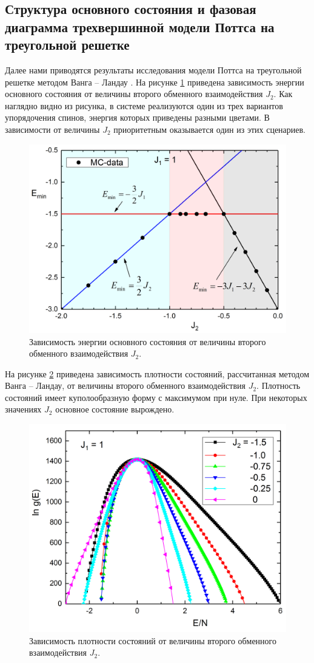 \subsection{Структура основного состояния и фазовая диаграмма трехвершинной модели Поттса на треугольной решетке}

Далее нами приводятся результаты исследования модели Поттса на треугольной решетке методом Ванга -- Ландау \cite{ph3_4, ph3_5, ph3_6, ph3_7}.
На рисунке \ref{phys3-pic-2} приведена зависимость энергии основного состояния от величины второго обменного взаимодействия $J_2$. Как наглядно видно из рисунка, в системе реализуются один из трех вариантов упорядочения спинов, энергия которых приведены разными цветами. В зависимости от величины $J_2$ приоритетным оказывается один из этих сценариев.

\begin{figure}[H]\label{phys3-pic-2}
	\centering
	\includegraphics[width=0.5\linewidth]{content/sections/images/phys3-2}
	\caption{Зависимость энергии основного состояния от величины второго обменного взаимодействия $J_2$.}
\end{figure}

На рисунке \ref{phys3-pic-3} приведена зависимость плотности состояний, рассчитанная методом Ванга -- Ландау, от величины второго обменного взаимодействия $J_2$. Плотность состояний имеет куполообразную форму с максимумом при нуле. При некоторых значениях $J_2$ основное состояние вырождено.

\begin{figure}[H]\label{phys3-pic-3}
	\centering
	\includegraphics[width=0.5\linewidth]{content/sections/images/phys3-3}
	\caption{Зависимость плотности состояний от величины второго обменного взаимодействия $J_2$.}
\end{figure}

